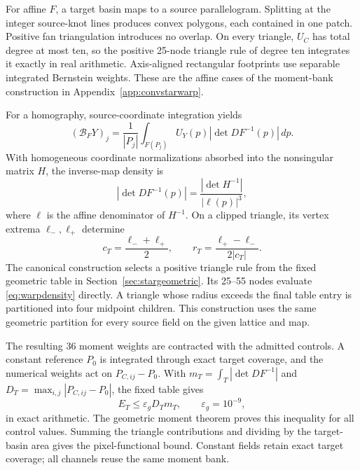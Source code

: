 \documentclass[journal]{IEEEtran}
\begin{document}
For affine \(F\), a target basin maps to a source parallelogram. Splitting
at the integer source-knot lines produces convex polygons, each contained in
one patch. Positive fan triangulation introduces no overlap. On every
triangle, \(U_C\) has total degree at most ten, so the positive 25-node
triangle rule of degree ten integrates it exactly in real arithmetic.
Axis-aligned rectangular footprints use separable integrated Bernstein
weights. These are the affine cases of the moment-bank construction in
Appendix~\ref{app:convstarwarp}.

For a homography, source-coordinate integration yields
\begin{equation}
 (\mathcal B_FY)_j=\frac1{|P_j|}
 \int_{F(P_j)}U_Y(p)\left|\det DF^{-1}(p)\right|\,dp.
 \label{eq:warpprojectiveintegral}
\end{equation}
With homogeneous coordinate normalizations absorbed into the nonsingular
matrix \(H\), the inverse-map density is
\begin{equation}
 \left|\det DF^{-1}(p)\right|
 =\frac{|\det H^{-1}|}{|\ell(p)|^3},
 \label{eq:warpdensity}
\end{equation}
where \(\ell\) is the affine denominator of \(H^{-1}\). On a clipped
triangle, its vertex extrema \(\ell_-,\ell_+\) determine
\begin{equation}
 c_T=\frac{\ell_-+\ell_+}{2},\qquad
 r_T=\frac{\ell_+-\ell_-}{2|c_T|}.
\end{equation}
The canonical construction selects a positive triangle rule from the fixed
geometric table in Section~\ref{sec:stargeometric}. Its 25--55 nodes evaluate
\eqref{eq:warpdensity} directly. A triangle whose radius exceeds the final
table entry is partitioned into four midpoint children. This construction
uses the same geometric partition for every source field on the given
lattice and map.

The resulting 36 moment weights are contracted with the admitted controls.
A constant reference \(P_0\) is integrated through exact target coverage,
and the numerical weights act on \(P_{C,ij}-P_0\). With
\(m_T=\int_T|\det DF^{-1}|\) and
\(D_T=\max_{i,j}|P_{C,ij}-P_0|\), the fixed table gives
\begin{equation}
 E_T\leq \varepsilon_gD_Tm_T,\qquad \varepsilon_g=10^{-9},
 \label{eq:warpprojectivecertificate}
\end{equation}
in exact arithmetic. The geometric moment theorem proves this inequality
for all control values. Summing the triangle contributions and dividing by
the target-basin area gives the pixel-functional bound. Constant fields
retain exact target coverage; all channels reuse the same moment bank.
\end{document}
